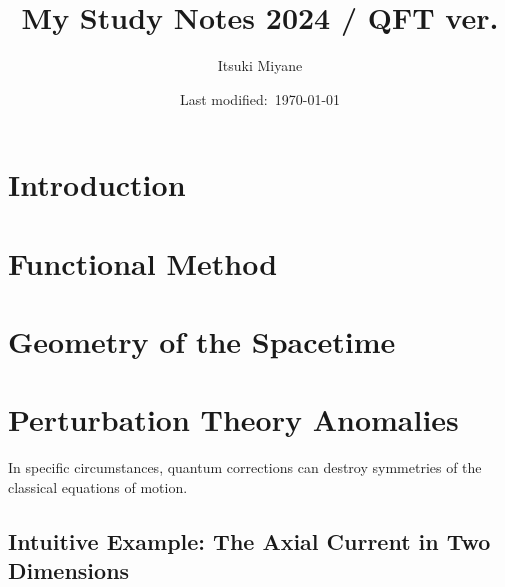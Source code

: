 \documentclass[a4paper,pdftex]{article}
\title{My Study Notes 2024 / QFT ver.}
\author{Itsuki Miyane}
\date{Last modified:\ \today}
\begin{document}
\maketitle

\tableofcontents

\clearpage
\section{Introduction}
















\clearpage
\section{Functional Method}

















\clearpage
\section{Geometry of the Spacetime}

























\clearpage
\section{Perturbation Theory Anomalies}

In specific circumstances, quantum corrections can destroy symmetries of the classical equations of motion.

\subsection{Intuitive Example: The Axial Current in Two Dimensions}
\end{document}
